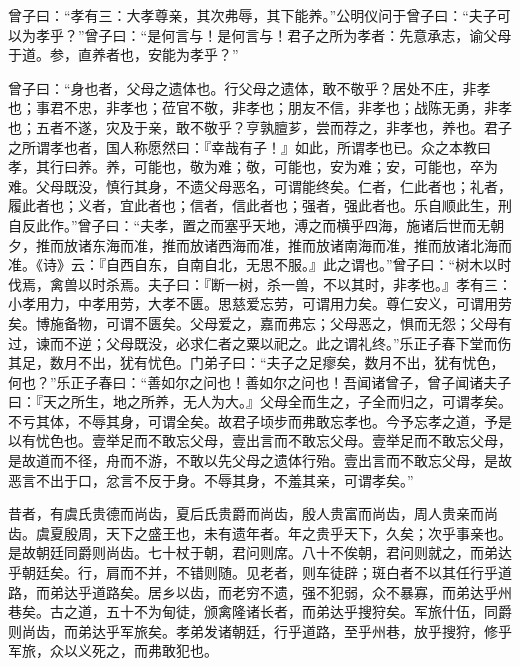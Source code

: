 \documentclass[]{article}
\begin{document}
曾子曰：``孝有三：大孝尊亲，其次弗辱，其下能养。''公明仪问于曾子曰：``夫子可以为孝乎？''曾子曰：``是何言与！是何言与！君子之所为孝者：先意承志，谕父母于道。参，直养者也，安能为孝乎？''

曾子曰：``身也者，父母之遗体也。行父母之遗体，敢不敬乎？居处不庄，非孝也；事君不忠，非孝也；莅官不敬，非孝也；朋友不信，非孝也；战陈无勇，非孝也；五者不遂，灾及于亲，敢不敬乎？亨孰膻芗，尝而荐之，非孝也，养也。君子之所谓孝也者，国人称愿然曰：『幸哉有子！』如此，所谓孝也已。众之本教曰孝，其行曰养。养，可能也，敬为难；敬，可能也，安为难；安，可能也，卒为难。父母既没，慎行其身，不遗父母恶名，可谓能终矣。仁者，仁此者也；礼者，履此者也；义者，宜此者也；信者，信此者也；强者，强此者也。乐自顺此生，刑自反此作。''曾子曰：``夫孝，置之而塞乎天地，溥之而横乎四海，施诸后世而无朝夕，推而放诸东海而准，推而放诸西海而准，推而放诸南海而准，推而放诸北海而准。《诗》云：『自西自东，自南自北，无思不服。』此之谓也。''曾子曰：``树木以时伐焉，禽兽以时杀焉。夫子曰：『断一树，杀一兽，不以其时，非孝也。』孝有三：小孝用力，中孝用劳，大孝不匮。思慈爱忘劳，可谓用力矣。尊仁安义，可谓用劳矣。博施备物，可谓不匮矣。父母爱之，嘉而弗忘；父母恶之，惧而无怨；父母有过，谏而不逆；父母既没，必求仁者之粟以祀之。此之谓礼终。''乐正子春下堂而伤其足，数月不出，犹有忧色。门弟子曰：``夫子之足瘳矣，数月不出，犹有忧色，何也？''乐正子春曰：``善如尔之问也！善如尔之问也！吾闻诸曾子，曾子闻诸夫子曰：『天之所生，地之所养，无人为大。』父母全而生之，子全而归之，可谓孝矣。不亏其体，不辱其身，可谓全矣。故君子顷步而弗敢忘孝也。今予忘孝之道，予是以有忧色也。壹举足而不敢忘父母，壹出言而不敢忘父母。壹举足而不敢忘父母，是故道而不径，舟而不游，不敢以先父母之遗体行殆。壹出言而不敢忘父母，是故恶言不出于口，忿言不反于身。不辱其身，不羞其亲，可谓孝矣。''

昔者，有虞氏贵德而尚齿，夏后氏贵爵而尚齿，殷人贵富而尚齿，周人贵亲而尚齿。虞夏殷周，天下之盛王也，未有遗年者。年之贵乎天下，久矣；次乎事亲也。是故朝廷同爵则尚齿。七十杖于朝，君问则席。八十不俟朝，君问则就之，而弟达乎朝廷矣。行，肩而不并，不错则随。见老者，则车徒辟；斑白者不以其任行乎道路，而弟达乎道路矣。居乡以齿，而老穷不遗，强不犯弱，众不暴寡，而弟达乎州巷矣。古之道，五十不为甸徒，颁禽隆诸长者，而弟达乎搜狩矣。军旅什伍，同爵则尚齿，而弟达乎军旅矣。孝弟发诸朝廷，行乎道路，至乎州巷，放乎搜狩，修乎军旅，众以义死之，而弗敢犯也。
\end{document}
